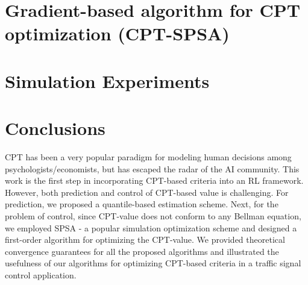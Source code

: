 \documentclass{article}
\begin{document}
\section{Gradient-based algorithm for CPT optimization (CPT-SPSA)}
\label{sec:1spsa}


\section{Simulation Experiments}
\label{sec:expts}





\section{Conclusions}
\label{sec:conclusions}
CPT has been a very popular paradigm for modeling human decisions among psychologists/economists, but has escaped the radar of the AI community. This work is the first step in incorporating CPT-based criteria into an RL framework. However, both prediction and control of CPT-based value is challenging. 
For prediction, we proposed a quantile-based estimation scheme. Next, for the problem of control, since CPT-value does not conform to any Bellman equation, we employed SPSA - a popular simulation optimization scheme and designed a first-order algorithm for optimizing the CPT-value. 
We provided theoretical convergence guarantees for all the proposed algorithms and illustrated the usefulness of our algorithms for optimizing CPT-based criteria in a traffic signal control application.
\end{document}
